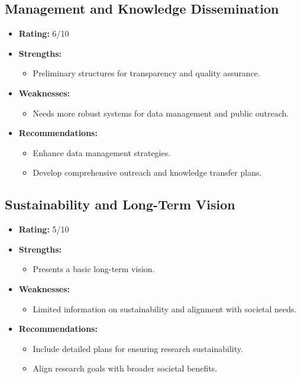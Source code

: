 \documentclass{article}
\begin{document}
\subsection{Management and Knowledge Dissemination}
\begin{itemize}
    \item \textbf{Rating:} 6/10
    \item \textbf{Strengths:}
        \begin{itemize}
            \item Preliminary structures for transparency and quality assurance.
        \end{itemize}
    \item \textbf{Weaknesses:}
        \begin{itemize}
            \item Needs more robust systems for data management and public outreach.
        \end{itemize}
    \item \textbf{Recommendations:}
        \begin{itemize}
            \item Enhance data management strategies.
            \item Develop comprehensive outreach and knowledge transfer plans.
        \end{itemize}
\end{itemize}

\subsection{Sustainability and Long-Term Vision}
\begin{itemize}
    \item \textbf{Rating:} 5/10
    \item \textbf{Strengths:}
        \begin{itemize}
            \item Presents a basic long-term vision.
        \end{itemize}
    \item \textbf{Weaknesses:}
        \begin{itemize}
            \item Limited information on sustainability and alignment with societal needs.
        \end{itemize}
    \item \textbf{Recommendations:}
        \begin{itemize}
            \item Include detailed plans for ensuring research sustainability.
            \item Align research goals with broader societal benefits.
        \end{itemize}
\end{itemize}
\end{document}
